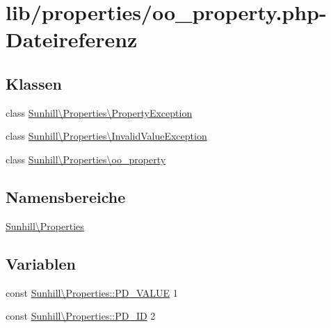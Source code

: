 \hypertarget{oo__property_8php}{}\section{lib/properties/oo\+\_\+property.php-\/\+Dateireferenz}
\label{oo__property_8php}
\subsection*{Klassen}
\begin{DoxyCompactItemize}
\item 
class \hyperlink{classSunhill_1_1Properties_1_1PropertyException}{Sunhill\textbackslash{}\+Properties\textbackslash{}\+Property\+Exception}
\item 
class \hyperlink{classSunhill_1_1Properties_1_1InvalidValueException}{Sunhill\textbackslash{}\+Properties\textbackslash{}\+Invalid\+Value\+Exception}
\item 
class \hyperlink{classSunhill_1_1Properties_1_1oo__property}{Sunhill\textbackslash{}\+Properties\textbackslash{}oo\+\_\+property}
\end{DoxyCompactItemize}
\subsection*{Namensbereiche}
\begin{DoxyCompactItemize}
\item 
 \hyperlink{namespaceSunhill_1_1Properties}{Sunhill\textbackslash{}\+Properties}
\end{DoxyCompactItemize}
\subsection*{Variablen}
\begin{DoxyCompactItemize}
\item 
const \hyperlink{namespaceSunhill_1_1Properties_a28c3de9e20fd246123a2853f7055117d}{Sunhill\textbackslash{}\+Properties\+::\+P\+D\+\_\+\+V\+A\+L\+UE} 1
\item 
const \hyperlink{namespaceSunhill_1_1Properties_ac3ed3b43c0e8bebb0244d11456e3d3c6}{Sunhill\textbackslash{}\+Properties\+::\+P\+D\+\_\+\+ID} 2
\end{DoxyCompactItemize}
